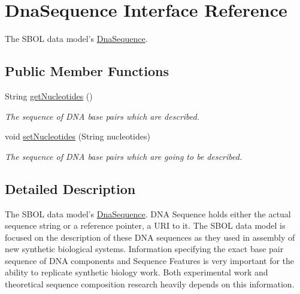 \hypertarget{interfaceorg_1_1sbolstandard_1_1core_1_1_dna_sequence}{
\section{DnaSequence Interface Reference}
\label{interfaceorg_1_1sbolstandard_1_1core_1_1_dna_sequence}
}


The SBOL data model's \hyperlink{interfaceorg_1_1sbolstandard_1_1core_1_1_dna_sequence}{DnaSequence}.  


\subsection*{Public Member Functions}
\begin{DoxyCompactItemize}
\item 
String \hyperlink{interfaceorg_1_1sbolstandard_1_1core_1_1_dna_sequence_a5f6eb346ca8c0209f0ed1a02fe6dafe7}{getNucleotides} ()
\begin{DoxyCompactList}\small\item\em The sequence of DNA base pairs which are described. \item\end{DoxyCompactList}\item 
void \hyperlink{interfaceorg_1_1sbolstandard_1_1core_1_1_dna_sequence_aaff7577138c6378f339e51d6e142f153}{setNucleotides} (String nucleotides)
\begin{DoxyCompactList}\small\item\em The sequence of DNA base pairs which are going to be described. \item\end{DoxyCompactList}\end{DoxyCompactItemize}


\subsection{Detailed Description}
The SBOL data model's \hyperlink{interfaceorg_1_1sbolstandard_1_1core_1_1_dna_sequence}{DnaSequence}. DNA Sequence holds either the actual sequence string or a reference pointer, a URI to it. The SBOL data model is focused on the description of these DNA sequences as they used in assembly of new synthetic biological systems. Information specifying the exact base pair sequence of DNA components and Sequence Features is very important for the ability to replicate synthetic biology work. Both experimental work and theoretical sequence composition research heavily depends on this information. 

